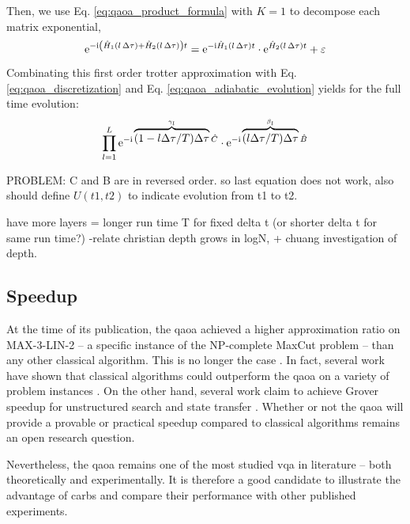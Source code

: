 Then, we use Eq. \eqref{eq:qaoa_product_formula} with $K = 1$ to decompose each matrix exponential,
\begin{equation}
    \mathrm e^{-\mathrm i\left(\hat H_{1}(l\,\Delta \tau) + \hat H_{2}(l\,\Delta \tau)\right) t} = \mathrm e^{-\mathrm i\hat H_{1}(l\,\Delta \tau)t}\cdot \mathrm e^{\hat H_{2}(l\,\Delta \tau) t} + \varepsilon 
\end{equation}
Combinating this first order trotter approximation with  Eq. \eqref{eq:qaoa_discretization} and Eq. \eqref{eq:qaoa_adiabatic_evolution} yields for the full time evolution:
\begin{equation}
    \prod_{l=1}^L\mathrm e^{-\mathrm i\overbrace{(1-l\Delta\tau/T)\Delta\tau}^{\gamma_l}\hat C} \cdot \mathrm e^{-\mathrm i\overbrace{(l\Delta\tau/T)\Delta\tau}^{\beta_l}\hat B} 
\end{equation}

PROBLEM: C and B are in reversed order. so last equation does not work, also should define $U(t1, t2) $ to indicate evolution from t1 to t2. 

have more layers = longer run time T for fixed delta t (or shorter delta t for same run time?)
-relate christian depth grows in logN, + chuang investigation of depth.

\subsection{Speedup}
At the time of its publication, the \gls{qaoa} achieved a higher approximation ratio on MAX-3-LIN-2 -- a specific instance of the NP-complete MaxCut problem \cite{GareyM1990} -- than any other classical algorithm. This is no longer the case \cite{Barak2015BeatingDegree, Hastings2019CLASSICALALGORITHMS}. In fact, several work have shown that classical algorithms could outperform the \gls{qaoa} on a variety of problem instances \cite{Barak2015BeatingDegree, Hastings2019CLASSICALALGORITHMS, Bravyi2019ObstaclesProtection}. On the other hand, several work claim to achieve Grover speedup for unstructured search \cite{Jiang2017Near-optimalField} and state transfer \cite{Niu2019OptimizingDepth}. Whether or not the \gls{qaoa} will provide a provable or practical speedup compared to classical algorithms remains an open research question.

Nevertheless, the \gls{qaoa} remains one of the most studied \gls{vqa} in literature -- both theoretically and experimentally. It is therefore a good candidate to illustrate the advantage of \glspl{carb} and compare their performance with other published experiments. 



